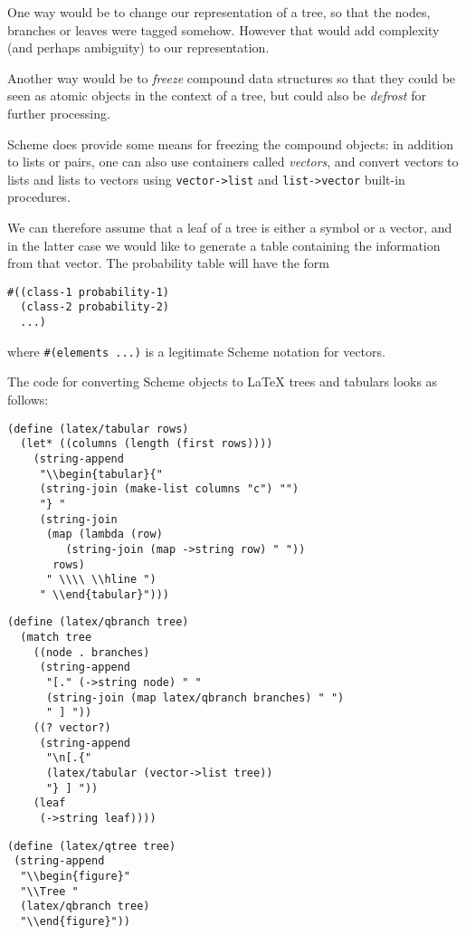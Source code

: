 One way would be to change our representation of a tree, so
that the nodes, branches or leaves were tagged somehow.
However that would add complexity (and perhaps ambiguity)
to our representation.

Another way would be to \textit{freeze} compound data structures
so that they could be seen as atomic objects in the context
of a tree, but could also be \textit{defrost} for further
processing.

Scheme does provide some means for freezing the compound
objects: in addition to lists or pairs, one can also use
containers called \textit{vectors}, and convert vectors
to lists and lists to vectors using \texttt{vector->list}
and \texttt{list->vector} built-in procedures.

We can therefore assume that a leaf of a tree is either
a symbol or a vector, and in the latter case we would
like to generate a table containing the information from
that vector. The probability table will have the form

\begin{Verbatim}[samepage=true]
#((class-1 probability-1)
  (class-2 probability-2)
  ...)
\end{Verbatim}

where \texttt{\#(elements ...)} is a legitimate Scheme
notation for vectors.

The code for converting Scheme objects to \LaTeX{} trees
and tabulars looks as follows:

\begin{Verbatim}[samepage=true]
(define (latex/tabular rows)
  (let* ((columns (length (first rows))))
    (string-append
     "\\begin{tabular}{"
     (string-join (make-list columns "c") "")
     "} "
     (string-join 
      (map (lambda (row)
	     (string-join (map ->string row) " "))
	   rows)
      " \\\\ \\hline ")
     " \\end{tabular}")))
\end{Verbatim}
\begin{Verbatim}[samepage=true]
(define (latex/qbranch tree)
  (match tree
    ((node . branches)
     (string-append 
      "[." (->string node) " "
      (string-join (map latex/qbranch branches) " ")
      " ] "))
    ((? vector?)
     (string-append 
      "\n[.{"
      (latex/tabular (vector->list tree))
      "} ] "))
    (leaf
     (->string leaf))))
\end{Verbatim}
\begin{Verbatim}[samepage=true]
(define (latex/qtree tree)
 (string-append 
  "\\begin{figure}"
  "\\Tree "
  (latex/qbranch tree)
  "\\end{figure}"))
\end{Verbatim}

